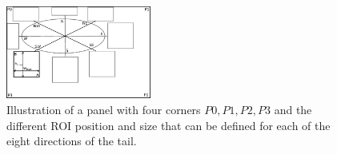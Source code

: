 

 \begin{figure}[!ht]
   \centering
  \includegraphics[width=180px]{roi_hypothesis.pdf}
  \caption[Illustration of the character region of interested computation for each of the eight directions of the tail]{Illustration of a panel with four corners $P0, P1, P2, P3$ and the different ROI position and size that can be defined for each of the eight directions of the tail.
  }
  \label{fig:se:roi_area}
 \end{figure}




